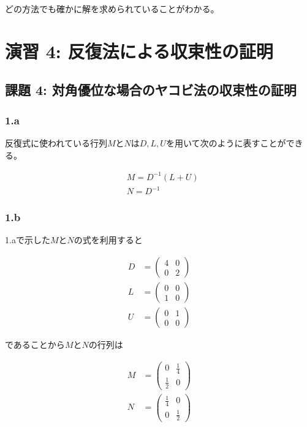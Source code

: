 \documentclass[a4paper]{jsarticle}
\begin{document}
どの方法でも確かに解を求められていることがわかる。

\section*{演習 4: 反復法による収束性の証明}

\subsection*{課題 4: 対角優位な場合のヤコビ法の収束性の証明}

\subsubsection*{1.a}
反復式に使われている行列\(M\)と\(N\)は\(D,L,U\)を用いて次のように表すことができる。

\begin{align*}
  &M = D^{-1}(L + U) \\
  &N = D^{-1}
\end{align*}

\subsubsection*{1.b}
1.aで示した\(M\)と\(N\)の式を利用すると

\begin{align*}
  D &= 
  \begin{pmatrix}
    4 & 0 \\
    0 & 2
  \end{pmatrix} \\
  L &= 
  \begin{pmatrix}
    0 & 0 \\
    1 & 0
  \end{pmatrix} \\
  U &= 
  \begin{pmatrix}
    0 & 1 \\
    0 & 0
  \end{pmatrix}
\end{align*}

であることから\(M\)と\(N\)の行列は

\begin{align*}
  M &= 
  \begin{pmatrix}
    0 & \frac{1}{4}\\
    \frac{1}{2} & 0
  \end{pmatrix} \\
  N &= 
  \begin{pmatrix}
    \frac{1}{4} & 0 \\
    0 & \frac{1}{2}
  \end{pmatrix}
\end{align*}
\end{document}
